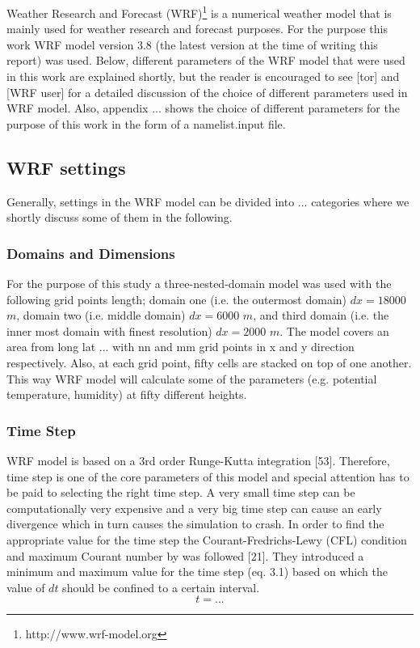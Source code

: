 \documentclass[a4paper,12pt]{article}
\numberwithin{equation}{section} %
\begin{document}
Weather Research and Forecast (WRF)\footnote{http://www.wrf-model.org} is a numerical weather model that is mainly used for weather research and forecast purposes. 
For the purpose this work WRF model version 3.8 (the latest version at the time of writing this report) was used. Below, different parameters of the WRF model that were used in this work are explained shortly, but the reader is encouraged to see [tor] and [WRF user] for a detailed discussion of the choice of different parameters used in WRF model. Also, appendix ... shows the choice of different parameters for the purpose of this work in the form of a namelist.input file. 


\subsection{WRF settings}
Generally, settings in the WRF model can be divided into ... categories where we shortly discuss some of them in the following.

\subsubsection{Domains and Dimensions}
For the purpose of this study a three-nested-domain model was used with the following grid points length; domain one (i.e. the outermost domain) $dx = 18000$ $m$, domain two (i.e. middle domain) $dx = 6000$ $m$, and third domain (i.e. the inner most domain with finest resolution) $dx = 2000$ $m$. The model covers an area from long lat ... with nn and mm grid points in x and y direction respectively. Also, at each grid point, fifty cells are stacked on top of one another. This way WRF model will calculate some of the parameters (e.g. potential temperature, humidity) at fifty different heights.

\subsubsection{Time Step}
WRF model is based on a 3rd order Runge-Kutta integration [53]. Therefore, time step is one of the core parameters of this model and special attention has to be paid to selecting the right time step. A very small time step can be computationally very expensive and a very big time step can cause an early divergence which in turn causes the simulation to crash. In order to find the appropriate value for the time step the Courant-Fredrichs-Lewy (CFL) condition and maximum Courant number by  was followed [21]. They introduced a minimum and maximum value for the time step (eq. 3.1) based on which the value of $dt$ should be confined to a certain interval.
\vspace{0.25cm}
\begin{equation}
t = ...
\end{equation}
\end{document}
